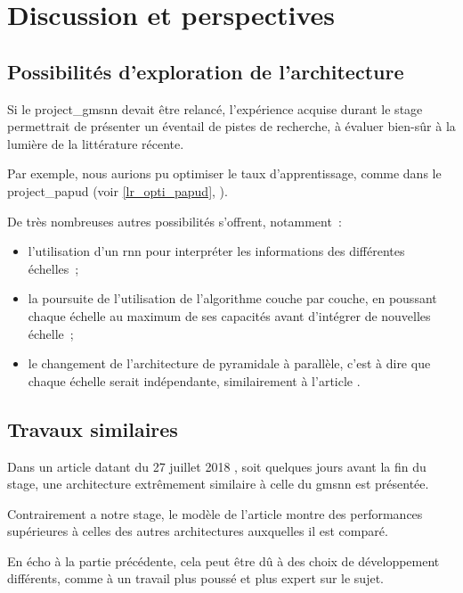 \section{Discussion et perspectives}
\subsection{Possibilités d'exploration de l'architecture}

Si le \gls{project_gmsnn} devait être relancé, l'expérience acquise durant le stage permettrait de présenter un éventail de pistes de recherche, à évaluer bien-sûr à la lumière de la littérature récente.

Par exemple, nous aurions pu optimiser le taux d'apprentissage, comme dans le \gls{project_papud} (voir \autoref{lr_opti_papud}, ).

De très nombreuses autres possibilités s'offrent, notamment~:
\begin{itemize}
	\item l'utilisation d'un \gls{rnn} pour interpréter les informations des différentes échelles~;
	\item la poursuite de l'utilisation de l'algorithme couche par couche, en poussant chaque échelle au maximum de ses capacités avant d'intégrer de nouvelles échelle~;
	\item le changement de l'architecture de pyramidale à parallèle, c'est à dire que chaque échelle serait indépendante, similairement à l'article \autocite{Xiao2018Jan}.
\end{itemize}

\subsection{Travaux similaires}
Dans un article datant du 27 juillet 2018 \autocite{hierachical_rnn}, soit quelques jours avant la fin du stage, une architecture extrêmement similaire à celle du \gls{gmsnn} est présentée.

Contrairement a notre stage, le modèle de l'article montre des performances supérieures à celles des autres architectures auxquelles il est comparé.

En écho à la partie précédente, cela peut être dû à des choix de développement différents, comme à un travail plus poussé et plus expert sur le sujet.
